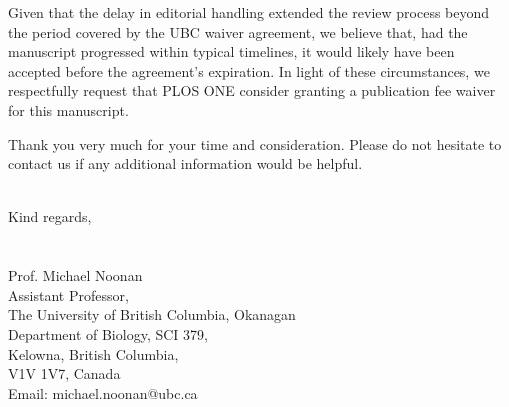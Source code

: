 \documentclass{article}
\begin{document}
Given that the delay in editorial handling extended the review process beyond the period covered by the UBC waiver agreement, we believe that, had the manuscript progressed within typical timelines, it would likely have been accepted before the agreement’s expiration. In light of these circumstances, we respectfully request that PLOS ONE consider granting a publication fee waiver for this manuscript.

Thank you very much for your time and consideration. Please do not hesitate to contact us if any additional information would be helpful.

\hfill \\

Kind regards,
\hfill \\
\hfill \\
\hfill \\
Prof. Michael Noonan\\
Assistant Professor,  \\
The University of British Columbia, Okanagan \\
Department of Biology, SCI 379,\\
Kelowna, British Columbia,\\
V1V 1V7, Canada\\
Email: michael.noonan@ubc.ca  %
\end{document}
